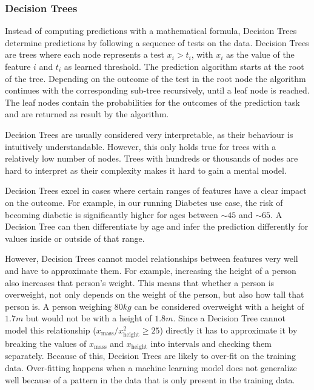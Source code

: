\subsubsection{Decision Trees}
Instead of computing predictions with a mathematical formula, Decision Trees determine predictions by following a sequence of tests on the data.
Decision Trees are trees where each node represents a test $x_i > t_i$, with $x_i$ as the value of the feature $i$ and $t_i$ as learned threshold.
The prediction algorithm starts at the root of the tree.
Depending on the outcome of the test in the root node the algorithm continues with the corresponding sub-tree recursively, until a leaf node is reached.
The leaf nodes contain the probabilities for the outcomes of the prediction task and are returned as result by the algorithm.

Decision Trees are usually considered very interpretable, as their behaviour is intuitively understandable.
However, this only holds true for trees with a relatively low number of nodes.
Trees with hundreds or thousands of nodes are hard to interpret as their complexity makes it hard to gain a mental model.

Decision Trees excel in cases where certain ranges of features have a clear impact on the outcome.
For example, in our running Diabetes use case, the risk of becoming diabetic is significantly higher for ages between ${\sim}45$ and ${\sim}65$.
A Decision Tree can then differentiate by age and infer the prediction differently for values inside or outside of that range.

However, Decision Trees cannot model relationships between features very well and have to approximate them.
For example, increasing the height of a person also increases that person's weight.
This means that whether a person is overweight, not only depends on the weight of the person, but also how tall that person is.
A person weighing $80\si{kg}$ can be considered overweight with a height of $1.7\si{m}$ but would not be with a height of $1.8\si{m}$.
Since a Decision Tree cannot model this relationship ($x_\text{mass} / x_\text{height}^2 \geq 25$) directly it has to approximate it by breaking the values of $x_\text{mass}$ and $x_\text{height}$ into intervals and checking them separately.
Because of this, Decision Trees are likely to over-fit on the training data.
Over-fitting happens when a machine learning model does not generalize well because of a pattern in the data that is only present in the training data.


